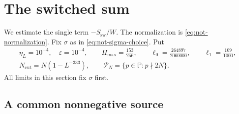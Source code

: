 \section{The switched sum}\label{sec:l3}

We estimate the single term $-S_{\mathrm{sw}}/W$.
The normalization is \eqref{eq:not-normalization}.
Fix $\sigma$ as in \eqref{eq:not-sigma-choice}.
Put
\begin{equation}\label{eq:l3-constants}
\begin{gathered}
 \eta_L=10^{-4},\quad\varepsilon=10^{-4},\qquad
 H_{\max}=\frac{153}{256},\qquad
 \ell_0=\frac{264897}{2060000},\qquad \ell_1=\frac{109}{1000},\\
 N_{\mathrm{cut}}=N(1-L^{-333}),\qquad
 \mathcal P_N=\{p\in\mathbb P:p\nmid2N\}.
\end{gathered}
\end{equation}
All limits in this section fix $\sigma$ first.

\subsection{A common nonnegative source}

